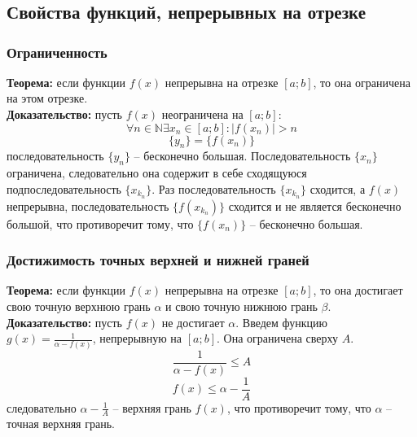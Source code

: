 \documentclass{article}
\newcommand{\theorem}{\textbf{Теорема:} }
\newcommand{\proof}{\textbf{Доказательство:} }
\newcommand{\seq}[1]{$\{#1\}$}
\newcommand{\otr}[2]{$[#1;#2]$}
\begin{document}
    \newpage
    
    \section{}
    \subsection*{Свойства  функций,  непрерывных  на  отрезке}
        \subsubsection*{Ограниченность}
        \theorem если функции $f(x)$ непрерывна на отрезке \otr{a}{b}, то она ограничена на этом отрезке.
        \\
        \proof пусть $f(x)$ неограничена на \otr{a}{b}:
        \[ \forall n \in \mathbb{N} \exists x_n \in [a;b]: |f(x_n)| > n \]
        \[ \{y_n\} = \{f(x_n)\} \]
        последовательность \seq{y_n} -- бесконечно большая. Последовательность \seq{x_n} ограничена, следовательно она содержит в себе сходящуюся подпоследовательность
        \seq{x_{k_n}}. Раз последовательность \seq{x_{k_n}} сходится, а $f(x)$ непрерывна, последовательность \seq{f(x_{k_n})} сходится и не является бесконечно большой,
        что противоречит тому, что \seq{f(x_n)} -- бесконечно большая.
        
        \subsubsection*{Достижимость точных верхней и нижней граней}
        \theorem если функции $f(x)$ непрерывна на отрезке \otr{a}{b}, то она достигает свою точную верхнюю грань $\alpha$ и свою точную нижнюю грань $\beta$.
        \\
        \proof пусть $f(x)$ не достигает $\alpha$. Введем функцию $g(x) = \frac{1}{\alpha - f(x)}$, непрерывную на \otr{a}{b}. Она ограничена сверху $A$.
        \[ \frac{1}{\alpha - f(x)} \le A \]
        \[ f(x) \le \alpha - \frac{1}{A} \]
        следовательно $\alpha - \frac{1}{A}$ -- верхняя грань $f(x)$, что противоречит тому, что $\alpha$ -- точная верхняя грань.
    
    
\end{document}
